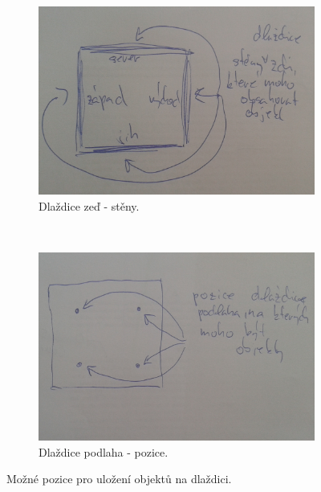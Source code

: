 	\begin{figure}
    \centering
    \begin{subfigure}[b]{0.45\textwidth}
        \includegraphics[width=\textwidth]{./img/DM-wall-sides.png}
        \caption{Dlaždice zeď - stěny.}
        \label{wall:analyza}
    \end{subfigure}
    ~ %
    \begin{subfigure}[b]{0.45\textwidth}
        \includegraphics[width=\textwidth]{./img/DM-floor-spaces.png}
        \caption{Dlaždice podlaha - pozice.}
        \label{floor:analyza}
    \end{subfigure}
    \caption{Možné pozice pro uložení objektů na dlaždici.}\label{tile-positions:analyza}
\end{figure}

